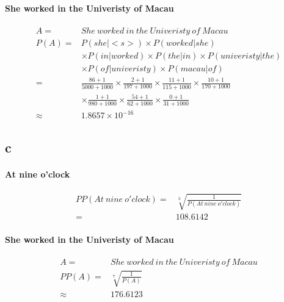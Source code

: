 \documentclass{article}
\begin{document}
    \paragraph{She worked in the Univeristy of Macau}
    \begin{equation}
        \begin{split}
            A=&She\ worked\  in\  the\  Univeristy\  of\  Macau\\
            P(A)=&P(she|<s>)\times P(worked|she)\\
                &\times P(in|worked)\times P(the|in)\times P(univeristy|the)\\
                &\times P(of|univeristy)\times P(macau|of)\\
                =&\frac{86+1}{5000+1000}\times\frac{2+1}{197+1000}\times\frac{11+1}{115+1000}\times\frac{10+1}{170+1000}\\ & \times\frac{1+1}{980+1000}\times\frac{54+1}{62+1000}\times\frac{0+1}{31+1000}\\
                \approx&1.8657\times 10^{-16}
        \end{split}
    \end{equation}

    \subsection*{c}
    \paragraph{At nine o'clock}
    \begin{equation}
        \begin{split}
            PP(At\  nine\  o'clock)=&\sqrt[3]{\frac{1}{P(At\  nine\  o'clock)}}\\
                                    =&108.6142
        \end{split}
    \end{equation}
    \paragraph{She worked in the Univeristy of Macau}
    \begin{equation}
        \begin{split}
            A=&She\ worked\  in\  the\  Univeristy\  of\  Macau\\
            PP(A)=&\sqrt[7]{\frac{1}{P(A)}}\\
            \approx&176.6123
        \end{split}
    \end{equation}
\end{document}
